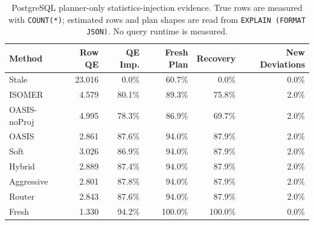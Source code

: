 \begin{table}[t]
  \centering
  \small
  \caption{PostgreSQL planner-only statistics-injection evidence. True rows are measured with \texttt{COUNT(*)}; estimated rows and plan shapes are read from \texttt{EXPLAIN (FORMAT JSON)}. No query runtime is measured.}
  \label{tab:postgres_planner_stats_injection}
  \setlength{\tabcolsep}{4pt}
  \begin{tabular}{lrrrrr}
    \toprule
    Method & Row QE & QE Imp. & Fresh Plan & Recovery & New Deviations \\
    \midrule
    Stale & 23.016 & 0.0\% & 60.7\% & 0.0\% & 0.0\% \\
    ISOMER & 4.579 & 80.1\% & 89.3\% & 75.8\% & 2.0\% \\
    OASIS-noProj & 4.995 & 78.3\% & 86.9\% & 69.7\% & 2.0\% \\
    OASIS & 2.861 & 87.6\% & 94.0\% & 87.9\% & 2.0\% \\
    Soft & 3.026 & 86.9\% & 94.0\% & 87.9\% & 2.0\% \\
    Hybrid & 2.889 & 87.4\% & 94.0\% & 87.9\% & 2.0\% \\
    Aggressive & 2.801 & 87.8\% & 94.0\% & 87.9\% & 2.0\% \\
    Router & 2.843 & 87.6\% & 94.0\% & 87.9\% & 2.0\% \\
    Fresh & 1.330 & 94.2\% & 100.0\% & 100.0\% & 0.0\% \\
    \bottomrule
  \end{tabular}
\end{table}
